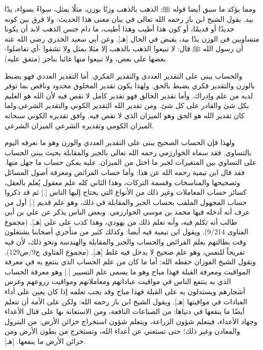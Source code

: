 ومما يؤكد ما سبق أيضا قوله ﷺ:
الذهب بالذهب وزنًا بوزن، مثلًا بمثل، سواءً بسواء، يدًا بيد.
يقول الشيخ ابن باز رحمه الله تعالى في بيان معنى هذا الحديث: ولا فرق بين كونه جديدًا أو قديمًا، أو كون هذا أطيب وهذا أطيب، ما دام جنس الذهب لابد أن يكونا متساويين في الوزن يدًا بيد، يقبض في الحال [هـ]. وعن أبي سعيد الخدري رضي الله عنه أن رسول الله ﷺ قال: لا تبيعوا الذهب بالذهب إلا مثلا بمثل ولا تشفوا -أي تفاضلوا- بعضها على بعض، ولا تبيعوا منها غائبا بناجز
{\footnotesize (متفق عليه)}.

والحساب يبنى على التقدير العددي والتقدير الفكري. أما التقدير العددي فهو يضبط بالوزن والتقدير فكري يضبط بالحق. ولهذا يكون تقدير المخلوق محدود وناقص بما توفر لديه من علم وإدراك. وأما تقدير الخالق فهو تقدير كامل لا نقص فيه لأن الله هو العليم بكل شئ والقادر على كل شئ. ومن تقدير الله التقدير الكوني والتقدير الشرعي.ولما كان تقدير الله هو الحق وهو الميزان الذي لا نقص فيه, وافق تقديره الكوني سبحانه الميزان الكومي وتقديره الشرعي الميزان الشرعي.

ولهذا فإن الحساب الصحيح يبنى على التقدير العددي والوزن وهو ما نعرفه اليوم بالتساوي. فقد سماه الخوارزمي رحمه الله تعالى بالجبر والمقابلة بحيث يبنى الحساب على التساوي بين المتغيرات لجبر ما اختل من الميزان, عليه يمكن حساب ما جهل منها. فقد قال ابن تيمية رحمه الله عن هذا:
وأما حساب الفرائض ومعرفة أصول المسائل وتصحيحها والمناسخات وقسمة التركات، وهذا الثاني كله علم معقول يُعلم بالعقل، كسائر حساب المعاملات وغير ذلك من الأنواع التي يحتاج إليها الناس [.] ثم قد ذكروا حساب المجهول الملقب بحساب الجبر والمقابلة في ذلك، وهو علم قديم [.] أول من عرف أنه أدخله فيها محمد بن موسى الخوارزمي. وبعض الناس يذكر عن علي بن أبي طالب أنه تكلم فيه، وأنه تعلم ذلك من يهودي، وهذا كذب على علي
[هـ].
{\footnotesize (مجموع الفتاوى 9/214)}.
ويقول اين تيمية فيه أيضا:
وكذلك كثير من متأخري أصحابنا يشتغلون وقت بطالتهم بعلم الفرائض والحساب والجبر والمقابلة والهندسة ونحو ذلك، لأن فيه تفريحاً للنفس، وهو علم صحيح لا يدخل فيه غلط
[هـ].
{\footnotesize (مجموع الفتاوى ج9/ص129)}.
ويقول الشيخ الفوزان حفظه الله:
أما ما كان من علم الحساب الذي ينتفع به في معرفة المواقيت ومعرفة القبلة فهذا مباح وهو ما يسمى علم التسيير [.] وهو معرفة الحساب الذي به ينتفع الناس في مواقيت عباداتهم ومعاملاتهم ومواقيت زروعهم وغرس أشجارهم ويستدلون به على القبلة فهذا مباح وقد يجب تعلمه إذا كان يعين على أداء العبادات في مواقيتها [هـ].
ويقول الشيخ ابن باز رحمه الله:
ولكن على الأمة أن تتعلم أيضًا ما ينفعها في دنياها: من الصناعات النافعة، ومن الاستعانة بها على قتال الأعداء وجهاد الأعداء، فيتعلم شؤون الزراعة، ويتعلم شؤون استخراج خزائن الأرض: من البترول والمعادن وغير ذلك؛ حتى تستغني عن أعداء الله، وتستخرج من بطون الأرض ومن خزائن الأرض ما ينفعها.
[هـ].

